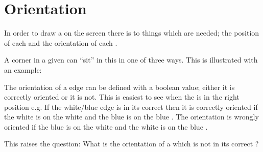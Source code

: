 \section{Orientation}
In order to draw a \rubik{} on the screen there is to things which are needed; the position of each \cubie{} and the orientation of each \cubie{}.

A corner \cubie{} in a given \cubicle{} can ``sit'' in this \cubicle{} in one of three ways.
This is illustrated with an example:


The orientation of a edge \cubie{} can be defined with a boolean value; either it is correctly oriented or it is not.
This is easiest to see when the \cubie{} is in the right position e.g.
If the white/blue edge \cubie{} is in its correct \cubicle{} then it is correctly oriented if the white \facelet{} is on the white \face{} and the blue \facelet{} is on the blue \face{}.
The orientation is wrongly oriented if the blue \facelet{} is on the white \face{} and the white \facelet{} is on the blue \face{}.

This raises the question: What is the orientation of a \cubie{} which is not in its correct \cubicle{}?
